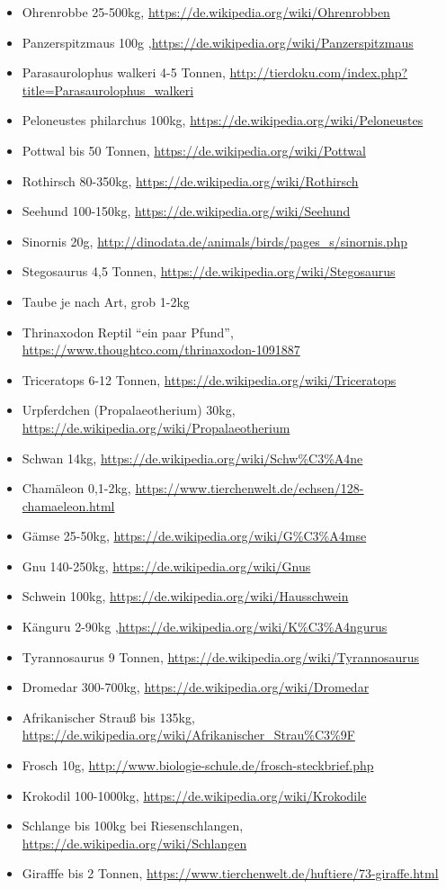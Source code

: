 \begin{itemize}
  \item Ohrenrobbe 25-500kg, \url{https://de.wikipedia.org/wiki/Ohrenrobben}
  \item Panzerspitzmaus 100g ,\url{https://de.wikipedia.org/wiki/Panzerspitzmaus}
  \item Parasaurolophus walkeri 4-5 Tonnen, \url{http://tierdoku.com/index.php?title=Parasaurolophus_walkeri}
  \item Peloneustes philarchus 100kg, \url{https://de.wikipedia.org/wiki/Peloneustes}
  \item Pottwal bis 50 Tonnen, \url{https://de.wikipedia.org/wiki/Pottwal}
  \item Rothirsch 80-350kg, \url{https://de.wikipedia.org/wiki/Rothirsch}
  \item Seehund 100-150kg, \url{https://de.wikipedia.org/wiki/Seehund}
  \item Sinornis 20g, \url{http://dinodata.de/animals/birds/pages_s/sinornis.php}
  \item Stegosaurus 4,5 Tonnen, \url{https://de.wikipedia.org/wiki/Stegosaurus}
  \item Taube je nach Art, grob 1-2kg
  \item Thrinaxodon Reptil "`ein paar Pfund"', \url{https://www.thoughtco.com/thrinaxodon-1091887}
  \item Triceratops 6-12 Tonnen, \url{https://de.wikipedia.org/wiki/Triceratops}
  \item Urpferdchen (Propalaeotherium) 30kg, \url{https://de.wikipedia.org/wiki/Propalaeotherium}
  \item Schwan 14kg, \url{https://de.wikipedia.org/wiki/Schw\%C3\%A4ne}
  \item Chamäleon 0,1-2kg, \url{https://www.tierchenwelt.de/echsen/128-chamaeleon.html}
  \item Gämse 25-50kg, \url{https://de.wikipedia.org/wiki/G\%C3\%A4mse}
  \item Gnu 140-250kg, \url{https://de.wikipedia.org/wiki/Gnus}
  \item Schwein 100kg, \url{https://de.wikipedia.org/wiki/Hausschwein}
  \item Känguru 2-90kg ,\url{https://de.wikipedia.org/wiki/K\%C3\%A4ngurus}
  \item Tyrannosaurus 9 Tonnen, \url{https://de.wikipedia.org/wiki/Tyrannosaurus}
  \item Dromedar 300-700kg, \url{https://de.wikipedia.org/wiki/Dromedar}
  \item Afrikanischer Strauß bis 135kg, \url{https://de.wikipedia.org/wiki/Afrikanischer_Strau\%C3\%9F}
  \item Frosch 10g, \url{http://www.biologie-schule.de/frosch-steckbrief.php}
  \item Krokodil 100-1000kg, \url{https://de.wikipedia.org/wiki/Krokodile}
  \item Schlange bis 100kg bei Riesenschlangen, \url{https://de.wikipedia.org/wiki/Schlangen}
  \item Girafffe bis 2 Tonnen, \url{https://www.tierchenwelt.de/huftiere/73-giraffe.html}
 \end{itemize}
 
